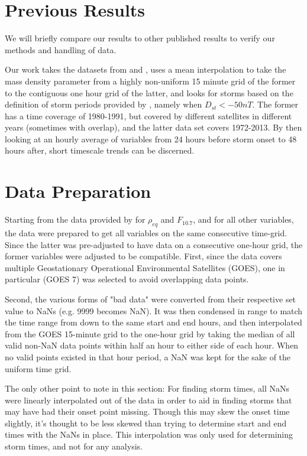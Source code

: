 \documentclass[10pt,twocolumn]{article}
\begin{document}
\section{Previous Results}
We will briefly compare our results to other published results to verify our methods and handling of data. 

Our work takes the datasets from \cite{Denton} and \cite{Reconstruction}, uses a mean interpolation to take the mass density parameter from a highly non-uniform 15 minute grid of the former to the contiguous one hour grid of the latter, and looks for storms based on the definition of storm periods provided by \cite{Takahashi2010}, namely when $D_{st}<-50nT$. The former has a time coverage of 1980-1991, but covered by different satellites in different years (sometimes with overlap), and the latter data set covers 1972-2013. By then looking at an hourly average of variables from 24 hours before storm onset to 48 hours after, short timescale trends can be discerned. 


\section{Data Preparation}
Starting from the data provided by \cite{Denton} for $\rho_{eq}$ and $F_{10.7}$, and \cite{Reconstruction} for all other variables, the data were prepared to get all variables on the same consecutive time-grid. Since the latter was pre-adjusted to have data on a consecutive one-hour grid, the former variables were adjusted to be compatible. First, since the data covers multiple Geostationary Operational Environmental Satellites (GOES), one in particular (GOES 7) was selected to avoid overlapping data points. 

Second, the various forms of "bad data" were converted from their respective set value to NaNs (e.g. 9999 becomes NaN). It was then condensed in range to match the time range from \cite{Reconstruction} down to the same start and end hours, and then interpolated from the GOES 15-minute grid to the one-hour grid by taking the median of all valid non-NaN data points within half an hour to either side of each hour. When no valid points existed in that hour period, a NaN was kept for the sake of the uniform time grid.

The only other point to note in this section: For finding storm times, all NaNs were linearly interpolated out of the data in order to aid in finding storms that may have had their onset point missing. Though this may skew the onset time slightly, it's thought to be less skewed than trying to determine start and end times with the NaNs in place. This interpolation was only used for determining storm times, and not for any analysis.
\end{document}
